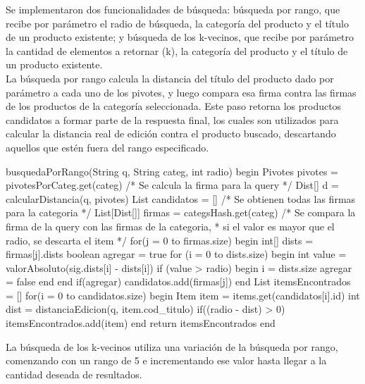 Se implementaron dos funcionalidades de b\'usqueda: b\'usqueda por rango, que recibe por par\'ametro el radio de b\'usqueda, la categor\'ia del producto y el t\'itulo de un producto existente; y b\'usqueda de los k-vecinos, que recibe por par\'ametro la cantidad de elementos a retornar (k), la categor\'ia del producto y el t\'itulo de un producto existente.\\

La b\'usqueda por rango calcula la distancia del t\'itulo del producto dado por par\'ametro a cada uno de los pivotes, y luego compara esa firma contra las firmas de los productos de la categor\'ia seleccionada. Este paso retorna los productos candidatos a formar parte de la respuesta final, los cuales son utilizados para calcular la distancia real de edici\'on contra el producto buscado, descartando aquellos que est\'en fuera del rango especificado.\\

\begin{algorithm}[caption={B\'usqueda por rango}, label={alg4}]
busquedaPorRango(String q, String categ, int radio)
begin
 Pivotes pivotes = pivotesPorCateg.get(categ)
 /* Se calcula la firma para la query */
 Dist[] d = calcularDistancia(q, pivotes)
 List candidatos = []
 /* Se obtienen todas las firmas para la categoria */
 List[Dist[]] firmas = categsHash.get(categ)
 /* Se compara la firma de la query con las firmas de la categoria, 
  * si el valor es mayor que el radio, se descarta el item */
 for(j = 0 to firmas.size)
 begin
  int[] dists = firmas[j].dists
  boolean agregar = true
  for (i = 0 to dists.size)
  begin
   int value = valorAbsoluto(sig.dists[i] - dists[i])
   if (value > radio)
   begin
    i = dists.size
    agregar = false
   end
  end
  if(agregar)
   candidatos.add(firmas[j])
 end
 List itemsEncontrados = []
 for(i = 0 to candidatos.size)
 begin
  Item item = items.get(candidatos[i].id)
  int dist = distanciaEdicion(q, item.cod_titulo)
  if((radio - dist) > 0)
   itemsEncontrados.add(item)
 end
 return itemsEncontrados
end
\end{algorithm}

La b\'usqueda de los k-vecinos utiliza una variaci\'on de la b\'usqueda por rango, comenzando con un rango de 5 e incrementando ese valor hasta llegar a la cantidad deseada de resultados.\\

